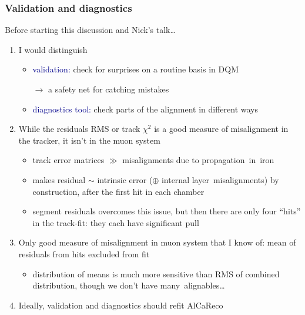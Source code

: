 \documentclass[compress]{beamer}
\begin{document}
\begin{frame}
\frametitle{Validation and diagnostics}
Before starting this discussion and Nick's talk\ldots

\begin{enumerate}\setlength{\itemsep}{0.1 cm}
\item I would distinguish
\begin{itemize}
\item \textcolor{darkblue}{validation:} check for surprises on a routine basis in DQM

$\longrightarrow$ a safety net for catching mistakes

\item \textcolor{darkblue}{diagnostics tool:} check parts of the alignment in different ways%

\end{itemize}

\item While the residuals RMS or track $\chi^2$ is a good measure of misalignment in
  the tracker, it isn't in the muon system
\begin{itemize}
\item track error matrices $\gg$ misalignments due to \mbox{propagation in iron\hspace{-1 cm}}
\item makes residual $\sim$ intrinsic error ($\oplus$ internal \mbox{layer misalignments)\hspace{-0.5 cm}}
by construction, after the first hit in each chamber
\item segment residuals overcomes this issue, but then there are only
  four ``hits'' in the track-fit: they each have significant pull
\end{itemize}

\item Only good measure of misalignment in muon system that I know of:
  mean of residuals from hits excluded from fit
\begin{itemize}
\item distribution of means is much more sensitive than RMS of combined distribution, though we don't have \mbox{many alignables\ldots\hspace{-1 cm}}
\end{itemize}

\item Ideally, validation and diagnostics should refit AlCaReco

\end{enumerate}
\end{frame}
\end{document}
